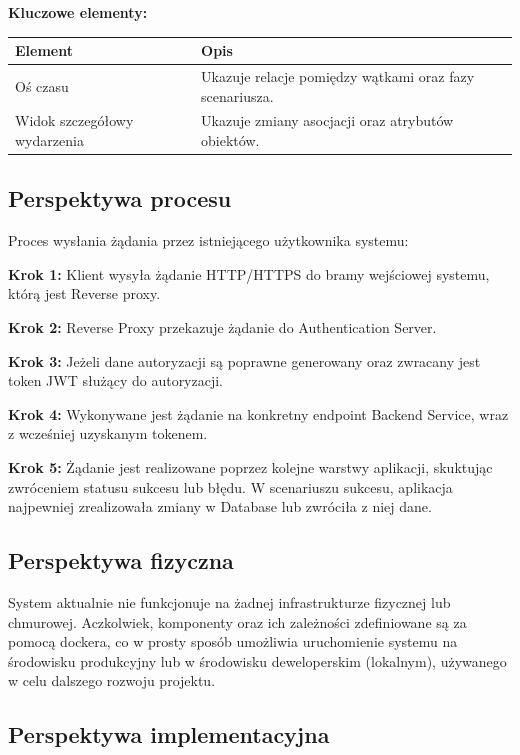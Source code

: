 \textbf{Kluczowe elementy:}
\begin{table}[H]
    \centering
    \begin{tabular}{|l|p{10cm}|}
        \hline
        \textbf{Element} & \textbf{Opis} \\
        \hline
        Oś czasu & Ukazuje relacje pomiędzy wątkami oraz fazy scenariusza. \\
        \hline
        Widok szczegółowy wydarzenia & Ukazuje zmiany asocjacji oraz atrybutów obiektów. \\
        \hline
    \end{tabular}
\end{table}

\subsection{Perspektywa procesu}

Proces wysłania żądania przez istniejącego użytkownika systemu:

\textbf{Krok 1:} Klient wysyła żądanie HTTP/HTTPS do bramy wejściowej systemu, którą jest Reverse proxy. 

\textbf{Krok 2:} Reverse Proxy przekazuje żądanie do Authentication Server. 

\textbf{Krok 3:} Jeżeli dane autoryzacji są poprawne generowany oraz zwracany jest token JWT służący do autoryzacji. 

\textbf{Krok 4:} Wykonywane jest żądanie na konkretny endpoint Backend Service, wraz z wcześniej uzyskanym tokenem.

\textbf{Krok 5:} Żądanie jest realizowane poprzez kolejne warstwy aplikacji, skuktując zwróceniem statusu sukcesu lub błędu. 
W scenariuszu sukcesu, aplikacja najpewniej zrealizowała zmiany w Database lub zwróciła z niej dane.


\subsection{Perspektywa fizyczna}

System aktualnie nie funkcjonuje na żadnej infrastrukturze fizycznej lub chmurowej. Aczkolwiek, komponenty oraz ich zależności
zdefiniowane są za pomocą dockera, co w prosty sposób umożliwia uruchomienie systemu na środowisku produkcyjny lub w środowisku
deweloperskim (lokalnym), używanego w celu dalszego rozwoju projektu.

\subsection{Perspektywa implementacyjna}

